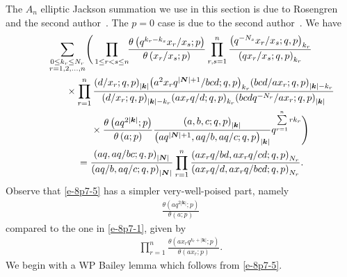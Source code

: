 \documentclass[pdftex]{sigma}
\numberwithin{equation}{section}
\newcommand{\sumN}{{\left| \boldsymbol{N} \right|}}
\newcommand\sumk{{\left| \boldsymbol{k} \right|}}
\newcommand{\multsum}[3]{{\sum\limits_{\substack{{0\le #1_#3 \le #2_#3} \\
{#3 =1,2,\dots, n}}}}}
\newcommand{\triprod}[1]{\prod\limits_{1\le r < s \le #1}}
\newcommand{\sqprod}[1]{\prod\limits_{r, s =1}^{#1}} %
\newcommand{\smallprod}[1]{\prod\limits_{r =1}^{#1}} %
\newcommand{\xover}[1]{#1_{r}/#1_{s}}
\newcommand{\ellipticqrfac}[2]{{\left({#1}; q, p\right)_{#2}}} %
\newcommand{\elliptictheta}[1]{\theta \left({#1} ; p\right) }
\newcommand{\ellipticvandermonde}[3]{\triprod{#3} %
\!\! \frac{\elliptictheta{q^{#2_r-#2_s} \xover {#1} }}{\elliptictheta{\xover{#1}}}
}
\begin{document}
The $A_n$ elliptic Jackson summation we use in this section is due to Rosengren and the second author~\cite{RS2017}. The $p=0$ case is due to the second author~\cite{MS2008}. We have
\begin{gather}
\multsum{k}{N}{r} \Bigg( \ellipticvandermonde{x}{k}{n}
\sqprod n \frac{\ellipticqrfac{q^{-N_s}\xover{x}}{k_r} }{\ellipticqrfac{q\xover{x}}{k_r} } \notag \\
\qquad\qquad{}\times \smallprod n \frac{\ellipticqrfac{d/x_r}{\sumk}
\ellipticqrfac{a^2 x_r q^{\sumN+1}/bcd}{k_r}
 \ellipticqrfac{bcd/a x_r}{\sumk-k_r}}
{\ellipticqrfac{d/x_r}{\sumk-k_r} \ellipticqrfac{ax_rq/d}{k_r}\ellipticqrfac{bcdq^{-N_r}/a x_r}{\sumk}}
\nonumber\\
\qquad\qquad{} \times \frac{\elliptictheta{aq^{2\sumk}}}{\elliptictheta{a}}
\frac{\ellipticqrfac{a, b, c}{\sumk}}{\ellipticqrfac{aq^{\sumN+1}, aq/b, aq/c}{\sumk}}
q^{\sum\limits_{r=1}^n rk_r} \Bigg)\notag \\
\qquad{} = \frac{\ellipticqrfac{aq, aq/bc}{\sumN}}{\ellipticqrfac{aq/b, aq/c}{\sumN}}
\smallprod n \frac{\ellipticqrfac{a x_rq/bd, a x_r q/cd}{N_r}}{\ellipticqrfac{a x_rq/d, a x_rq/bcd}{N_r}}. \label{e-8p7-5}
\end{gather}
Observe that \eqref{e-8p7-5} has a simpler very-well-poised part, namely
\begin{gather*}\frac{\elliptictheta{aq^{2\sumk}}}{\elliptictheta{a}}
\end{gather*}
compared to the one in \eqref{e-8p7-1}, given by
\begin{gather*}
\smallprod n \frac{\elliptictheta{ ax_rq^{k_r+\sumk}}}{\elliptictheta{ax_r}}.
\end{gather*}
We begin with a WP Bailey lemma which follows from \eqref{e-8p7-5}.
\end{document}
